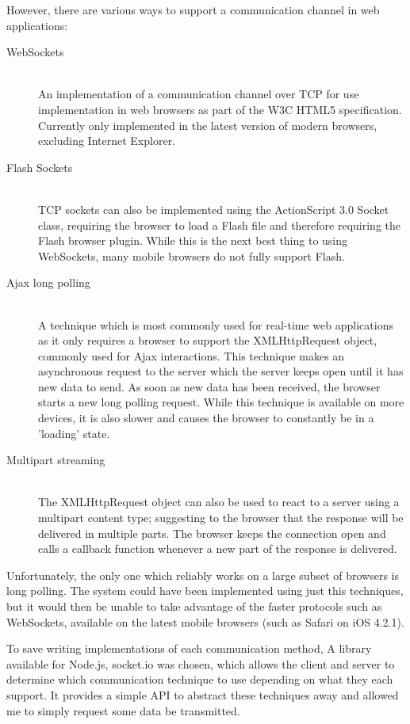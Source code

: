 \documentclass[a4papert,11pt,notitlepage]{article}
\begin{document}
However, there are various ways to support a  communication channel in web applications\cite{crane:comet}\cite{comet:web}:
\begin{description}
\item[WebSockets\cite{websockets:web}] \hfill \\
An implementation of a communication channel over TCP for use implementation in web browsers as part of the W3C HTML5 specification. Currently only implemented in the latest version of modern browsers, excluding Internet Explorer.
\item[Flash Sockets\cite{flashsockets:web}] \hfill \\
TCP sockets can also be implemented using the ActionScript 3.0 Socket class, requiring the browser to load a Flash file and therefore requiring the Flash browser plugin. While this is the next best thing to using WebSockets, many mobile browsers do not fully support Flash.
\item[Ajax long polling\cite{longpolling:web}] \hfill \\
A technique which is most commonly used for real-time web applications as it only requires a browser to support the XMLHttpRequest object, commonly used for Ajax interactions. This technique makes an asynchronous request to the server which the server keeps open until it has new data to send. As soon as new data has been received, the browser starts a new long polling request. While this technique is available on more devices, it is also slower and causes the browser to constantly be in a 'loading' state.
\item[Multipart streaming] \hfill \\
The XMLHttpRequest\cite{xmlhttprequest:web} object can also be used to react to a server using a multipart content type; suggesting to the browser that the response will be delivered in multiple parts. The browser keeps the connection open and calls a callback function whenever a new part of the response is delivered.
\end{description}

Unfortunately, the only one which reliably works on a large subset of browsers is long polling. The system could have been implemented using just this techniques, but it would then be unable to take advantage of the faster protocols such as WebSockets, available on the latest mobile browsers (such as Safari on iOS 4.2.1).

To save writing implementations of each communication method, A library available for Node.js, socket.io\cite{socketio:web} was chosen, which allows the client and server to determine which communication technique to use depending on what they each support. It provides a simple API to abstract these techniques away and allowed me to simply request some data be transmitted. 
\end{document}
